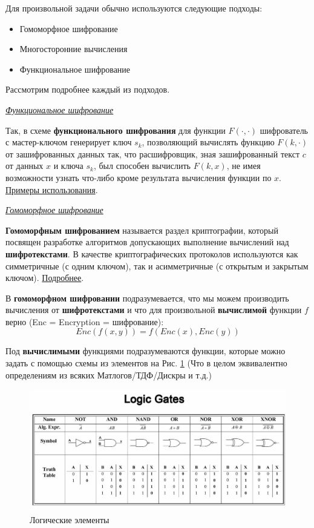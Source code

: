 Для произвольной задачи обычно используются следующие подходы:
\begin{itemize}
	\item Гомоморфное шифрование
	\item Многосторонние вычисления
	\item Функциональное шифрование 
\end{itemize}

Рассмотрим подробнее каждый из подходов.

\begin{center}
	\textit{\underline{Функциональное шифрование}}
\end{center}

Так, в схеме \textbf{функционального шифрования} для функции $F(\cdot, \cdot)$ шифрователь с мастер-ключом генерирует ключ $s_k$, позволяющий вычислять функцию $F(k, \cdot)$ от зашифрованных данных так, что расшифровщик, зная зашифрованный текст $c$ от данных $x$ и ключа $s_k$, был способен вычислить $F(k, x)$, не имея возможности узнать что-либо кроме результата вычисления функции по $x$. \href{https://habr.com/ru/post/482790/}{Примеры использования}.

\begin{center}
	\textit{\underline{Гомоморфное шифрование}}
\end{center}

\textbf{Гомоморфным шифрованием} называется раздел криптографии, который посвящен разработке алгоритмов допускающих выполнение вычислений над \textbf{шифротекстами}. В качестве криптографических протоколов используются как симметричные (с одним ключом), так и асимметричные (с открытым и закрытым ключом). \href{https://otus.ru/nest/post/726/}{Подробнее}.

В \textbf{гомоморфном шифровании} подразумевается, что мы можем производить вычисления от \textbf{шифротекстами} и что для произвольной \textbf{вычислимой} функции $f$ верно (Enc = Encryption = шифрование):
$$Enc(f(x, y)) = f(Enc(x), Enc(y))$$

Под \textbf{вычислимыми} функциями подразумеваются функции, которые можно задать с помощью схемы из элементов на Рис. \ref{fig:logicscheme} (Что в целом эквивалентно определениям из всяких Матлогов/ТДФ/Дискры и т.д.)
\begin{figure}[H]
	\centering
	\includegraphics[scale = 0.3]{26/logic_cheme.jpeg}
	\caption{Логические элементы}
	\label{fig:logicscheme}
\end{figure}

